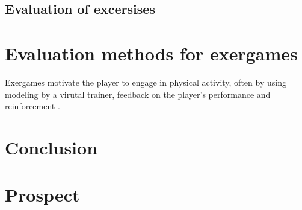 \section{Evaluation of excersises}


\chapter{Evaluation methods for exergames}


Exergames motivate the player to engage in physical activity, often by using modeling by a virutal trainer, feedback on the player's performance and reinforcement \cite{lyons13strategies}.

\chapter{Conclusion}

\chapter{Prospect}



	

  		
